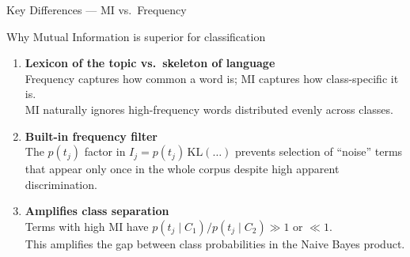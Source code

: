 \begin{frame}{Key Differences — MI vs.\ Frequency}
  \begin{block}{Why Mutual Information is superior for classification}
    \begin{enumerate}
      \item \textbf{Lexicon of the topic vs.\ skeleton of language}\\
            Frequency captures how common a word is; MI captures how class-specific it is.\\
            MI naturally ignores high-frequency words distributed evenly across classes.

      \medskip
      \item \textbf{Built-in frequency filter}\\
            The $p(t_j)$ factor in $I_j = p(t_j)\,\mathrm{KL}(\ldots)$ prevents selection of
            ``noise'' terms that appear only once in the whole corpus despite high apparent discrimination.

      \medskip
      \item \textbf{Amplifies class separation}\\
            Terms with high MI have $p(t_j\mid C_1)/p(t_j\mid C_2)\gg1$ or $\ll1$.\\
            This amplifies the gap between class probabilities in the Naive Bayes product.
    \end{enumerate}
  \end{block}
\end{frame}

